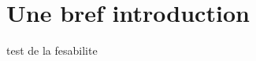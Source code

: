 \documentclass[French,Hoar.tex]{subfiles}
\begin{document}
  \section{Une bref introduction}
  test de la fesabilite
\end{document}
